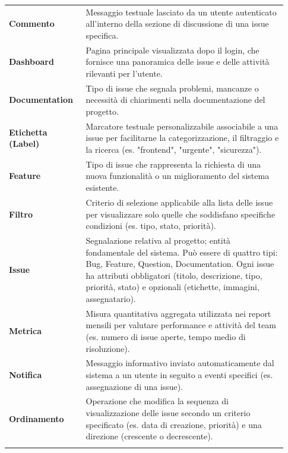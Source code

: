\begin{ucbox}[title=Glossario dei Termini]
\begin{longtable}{p{0.25\linewidth} p{0.68\linewidth}}
\textbf{Commento} & Messaggio testuale lasciato da un utente autenticato all'interno della sezione di discussione di una issue specifica. \\
\addlinespace

\textbf{Dashboard} & Pagina principale visualizzata dopo il login, che fornisce una panoramica delle issue e delle attività rilevanti per l'utente. \\
\addlinespace

\textbf{Documentation} & Tipo di issue che segnala problemi, mancanze o necessità di chiarimenti nella documentazione del progetto. \\
\addlinespace

\textbf{Etichetta (Label)} & Marcatore testuale personalizzabile associabile a una issue per facilitarne la categorizzazione, il filtraggio e la ricerca (es. "frontend", "urgente", "sicurezza"). \\
\addlinespace

\textbf{Feature} & Tipo di issue che rappresenta la richiesta di una nuova funzionalità o un miglioramento del sistema esistente. \\
\addlinespace

\textbf{Filtro} & Criterio di selezione applicabile alla lista delle issue per visualizzare solo quelle che soddisfano specifiche condizioni (es. tipo, stato, priorità). \\
\addlinespace

\textbf{Issue} & Segnalazione relativa al progetto; entità fondamentale del sistema. Può essere di quattro tipi: Bug, Feature, Question, Documentation. Ogni issue ha attributi obbligatori (titolo, descrizione, tipo, priorità, stato) e opzionali (etichette, immagini, assegnatario). \\
\addlinespace

\textbf{Metrica} & Misura quantitativa aggregata utilizzata nei report mensili per valutare performance e attività del team (es. numero di issue aperte, tempo medio di risoluzione). \\
\addlinespace

\textbf{Notifica} & Messaggio informativo inviato automaticamente dal sistema a un utente in seguito a eventi specifici (es. assegnazione di una issue). \\
\addlinespace

\textbf{Ordinamento} & Operazione che modifica la sequenza di visualizzazione delle issue secondo un criterio specificato (es. data di creazione, priorità) e una direzione (crescente o decrescente). \\
\addlinespace


\end{longtable}
\end{ucbox}

